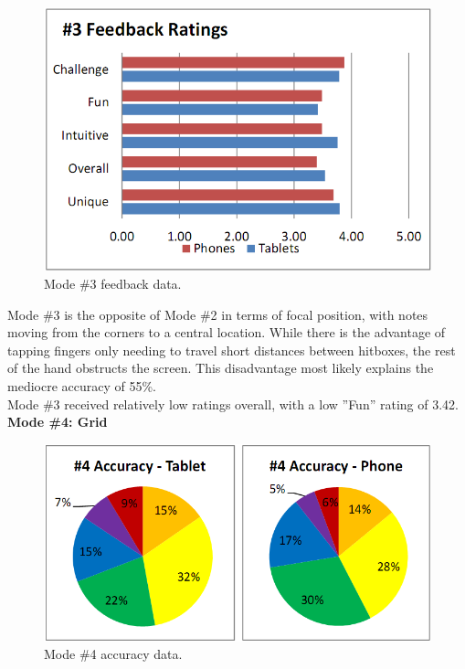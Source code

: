 \documentclass{sig-alternate}
\begin{document}
\begin{figure}[htb!]
	\begin{center}
		\includegraphics[width=1\linewidth]{figure_chart_rating_3}
	\end{center}
	\vspace{-12pt}
	\caption{Mode \#3 feedback data.}
	\label{fig:chart_rating_3}
\end{figure}

Mode \#3 is the opposite of Mode \#2 in terms of focal position, with notes moving from the corners to a central location. While there is the advantage of tapping fingers only needing to travel short distances between hitboxes, the rest of the hand obstructs the screen. This disadvantage most likely explains the mediocre accuracy of 55\%. \\

Mode \#3 received relatively low ratings overall, with a low ''Fun'' rating of 3.42. \\

\newpage
\noindent \textbf{Mode \#4: Grid}

\begin{figure}[htb!]
	\begin{center}
		\includegraphics[width=1\linewidth]{figure_chart_accuracy_4}
	\end{center}
	\vspace{-12pt}
	\caption{Mode \#4 accuracy data.}
	\label{fig:chart_accuracy_4}
\end{figure}
\end{document}
